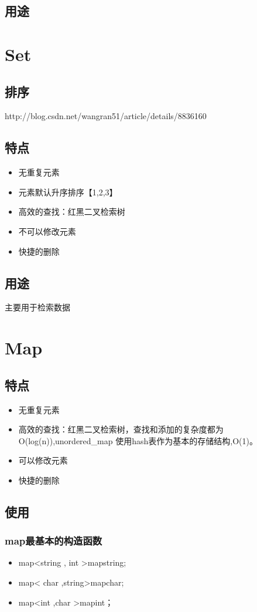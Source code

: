 \documentclass[UTF8,a4paper,12pt]{ctexbook}
\begin{document}
		\subsection{用途}
		
	\newpage
	\section{Set }
		\subsection{排序}http://blog.csdn.net/wangran51/article/details/8836160
		
		\subsection{特点}
			\begin{itemize}
				\item 无重复元素
				\item 元素默认升序排序【1,2,3】
				\item 高效的查找：红黑二叉检索树
				\item 不可以修改元素
				\item 快捷的删除
			\end{itemize}
		\subsection{用途}
			主要用于检索数据


	\newpage
	\section{Map}	
	 	\subsection{特点}
		 	\begin{itemize}
		 		\item 无重复元素
		 		\item 高效的查找：红黑二叉检索树，查找和添加的复杂度都为O(log(n)),unordered\_map 使用hash表作为基本的存储结构,O(1)。
		 		\item 可以修改元素
		 		\item 快捷的删除
		 	\end{itemize} 
		 \subsection{使用}
			\subsubsection{map最基本的构造函数} 
				\begin{itemize}
					\item  map<string , int >mapstring;
					\item  map< char ,string>mapchar;
					\item  map<int ,char >mapint；
				\end{itemize}
\end{document}
